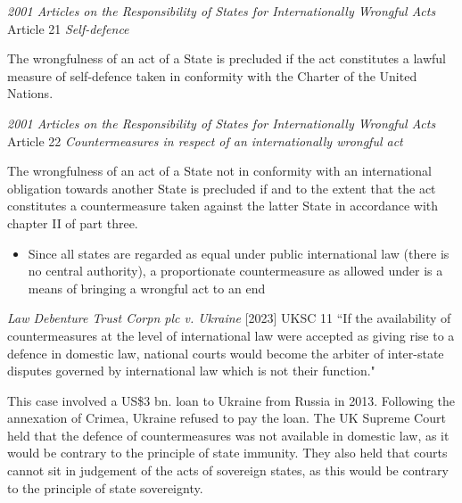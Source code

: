 \begin{conventiondetails}{\textit{2001 Articles on the Responsibility of States for Internationally Wrongful Acts} Article 21}
    \flushleft
    \textit{Self-defence}

    \vspace{\baselineskip}

    The wrongfulness of an act of a State is precluded if the act constitutes a lawful measure of self-defence taken in conformity with the Charter of the United Nations.
\end{conventiondetails}

\begin{conventiondetails}{\textit{2001 Articles on the Responsibility of States for Internationally Wrongful Acts} Article 22}
    \flushleft
    \textit{Countermeasures in respect of an internationally wrongful act}

    \vspace{\baselineskip}

    The wrongfulness of an act of a State not in conformity with an international obligation towards another State is precluded if and to the extent that the act constitutes a countermeasure taken against the latter State in accordance with chapter II of part three.
\end{conventiondetails}

\begin{itemize}
    \item Since all states are regarded as equal under public international law (there is no central authority), a proportionate countermeasure as allowed under  is a means of bringing a wrongful act to an end
\end{itemize}

\begin{casedetails}{\textit{Law Debenture Trust Corpn plc v. Ukraine} [2023] UKSC 11}
    \flushleft
    ``If the availability of countermeasures at the level of international law were accepted as giving rise to a defence in domestic law, national courts would become the arbiter of inter-state disputes governed by international law which is not their function."

    \vspace{\baselineskip}

    This case involved a US\$3 bn. loan to Ukraine from Russia in 2013. Following the annexation of Crimea, Ukraine refused to pay the loan. The UK Supreme Court held that the defence of countermeasures was not available in domestic law, as it would be contrary to the principle of state immunity. They also held that courts cannot sit in judgement of the acts of sovereign states, as this would be contrary to the principle of state sovereignty.
\end{casedetails}


